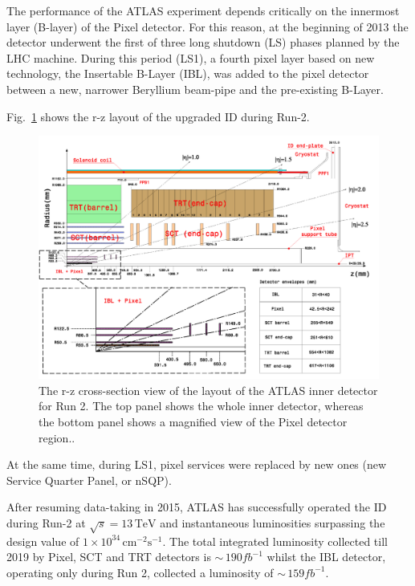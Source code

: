 The performance of the ATLAS experiment depends critically on the innermost layer (B-layer) of the Pixel detector. 
For this reason, at the beginning of 2013 the detector underwent the first of three long shutdown (LS) phases planned by the LHC machine. 
During this period (LS1), a fourth pixel layer based on new technology, the Insertable B-Layer (IBL)\cite{IBLPaper}, 
was added to the pixel detector between a new, narrower Beryllium beam-pipe and the pre-existing B-Layer. 

Fig.~\ref{fig:IDRun2Layout} shows the r-z layout of the upgraded ID during Run-2.

\begin{figure}
  \centering\includegraphics[width=1\linewidth]{figures/ElectronicsChapter/ATLAS/ID_Run2Layout.pdf}
  \caption{The r-z cross-section view of the layout of the ATLAS inner detector for Run 2. The top panel shows the
whole inner detector, whereas the bottom panel shows a magnified view of the Pixel detector region..}
  \label{fig:IDRun2Layout}
\end{figure}

At the same time, during LS1, pixel services were replaced by new ones (new Service Quarter Panel, or nSQP). 

After resuming data-taking in 2015, ATLAS has successfully operated the ID during
Run-2 at  \mbox{$\sqrt{s}=13\,{\text{TeV}}$} and instantaneous luminosities surpassing the design value of \mbox{$1\times10^{34}\,{\text{cm}}^{-2}{\text{s}}^{-1}$}.
The total integrated luminosity collected till 2019 by Pixel, SCT and TRT detectors is $\sim\,190 fb^{-1}$ whilst the IBL detector, operating only during Run 2, collected a luminosity of  $\sim\,159 fb^{-1}$.


